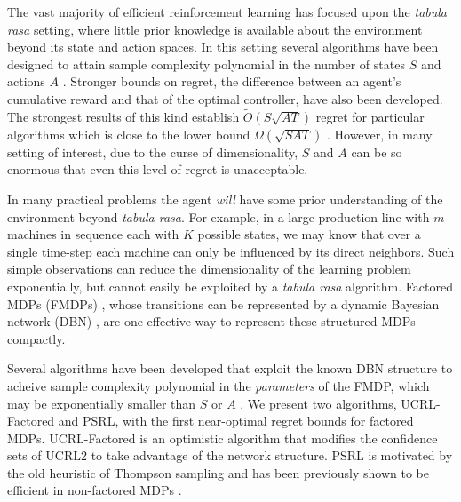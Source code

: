 \documentclass{article}
\begin{document}
The vast majority of efficient reinforcement learning has focused upon the {\it tabula rasa} setting, where little prior knowledge is available about the environment beyond its state and action spaces.
In this setting several algorithms have been designed to attain sample complexity polynomial in the number of states $S$ and actions $A$ \cite{kearns2002near, brafman2003r}.
Stronger bounds on regret, the difference between an agent's cumulative reward and that of the optimal controller, have also been developed.
The strongest results of this kind establish $\tilde{O}(S\sqrt{AT})$ regret for particular algorithms \cite{jaksch2010near,bartlett2009regal,osband2013more} which is close to the lower bound $\Omega(\sqrt{SAT})$ \cite{jaksch2010near}.
However, in many setting of interest, due to the curse of dimensionality, $S$ and $A$ can be so enormous that even this level of regret is unacceptable.

In many practical problems the agent \emph{will} have some prior understanding of the environment beyond {\it tabula rasa}.
For example, in a large production line with $m$ machines in sequence each with $K$ possible states, we may know that over a single time-step each machine can only be influenced by its direct neighbors.
Such simple observations can reduce the dimensionality of the learning problem exponentially, but cannot easily be exploited by a {\it tabula rasa} algorithm.
Factored MDPs (FMDPs) \cite{boutilier2000stochastic}, whose transitions can be represented by a dynamic Bayesian network (DBN) \cite{ghahramani1998learning}, are one effective way to represent these structured MDPs compactly.

Several algorithms have been developed that exploit the known DBN structure to acheive sample complexity polynomial in the \emph{parameters} of the FMDP, which may be exponentially smaller than $S$ or $A$ \cite{strehl2007model,kearns1999efficient,szita2009optimistic}.
We present two algorithms, UCRL-Factored and PSRL, with the first near-optimal regret bounds for factored MDPs.
UCRL-Factored is an optimistic algorithm that modifies the confidence sets of UCRL2 \cite{jaksch2010near} to take advantage of the network structure.
PSRL is motivated by the old heuristic of Thompson sampling \cite{thompson1933} and has been previously shown to be efficient in non-factored MDPs \cite{strens2000bayesian,osband2013more}.
\end{document}
